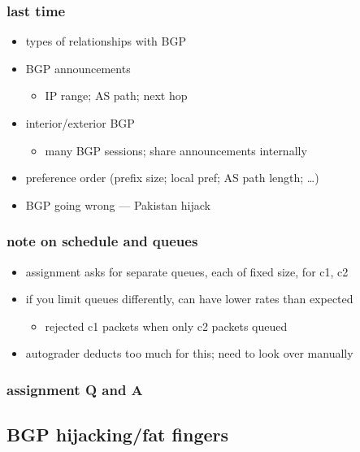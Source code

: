 \date{}
\title{}
\date{}

\begin{frame}
    \titlepage
\end{frame}



\begin{frame}
\frametitle{last time}
\begin{itemize}
\item types of relationships with BGP
\item BGP announcements
    \begin{itemize}
    \item IP range; AS path; next hop
    \end{itemize}
\item interior/exterior BGP
    \begin{itemize}
    \item many BGP sessions; share announcements internally
    \end{itemize}
\item preference order (prefix size; local pref; AS path length; \ldots)
\item BGP going wrong --- Pakistan hijack
\end{itemize}
\end{frame}



\begin{frame}
\frametitle{note on schedule and queues}
\begin{itemize}
\item assignment asks for separate queues, each of fixed size, for c1, c2
\item if you limit queues differently, can have lower rates than expected
        \begin{itemize}
            \item rejected c1 packets when only c2 packets queued
        \end{itemize}
\item autograder deducts too much for this; need to look over manually
\end{itemize}
\end{frame}

\begin{frame}
\frametitle{assignment Q and A}
\end{frame}

\subsection{BGP hijacking/fat fingers}


